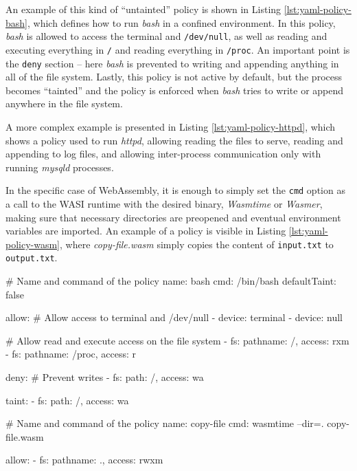 An example of this kind of ``untainted'' policy is shown in Listing \ref{lst:yaml-policy-bash}, which defines how to
run \textit{bash} in a confined environment.
In this policy, \textit{bash} is allowed to access the terminal and \texttt{/dev/null}, as well
as reading and executing everything in \texttt{/} and reading everything in \texttt{/proc}.
An important point is the \texttt{deny} section -- here \textit{bash} is prevented to writing and
appending anything in all of the file system.
Lastly, this policy is not active by default, but the process becomes ``tainted'' and the policy is enforced
when \textit{bash} tries to write or append anywhere in the file system.

A more complex example is presented in Listing \ref{lst:yaml-policy-httpd}, which shows a policy
used to run \textit{httpd}, allowing reading the files to serve, reading and appending to log files,
and allowing inter-process communication only with running \textit{mysqld} processes.

In the specific case of WebAssembly, it is enough to simply set the \texttt{cmd} option as
a call to the WASI runtime with the desired binary, \textit{Wasmtime} or \textit{Wasmer}, making sure that
necessary directories are preopened and eventual environment variables are imported.
An example of a policy is visible in Listing \ref{lst:yaml-policy-wasm}, where \textit{copy-file.wasm} simply copies
the content of \texttt{input.txt} to \texttt{output.txt}.

\vspace*{0.5cm}
\begin{code}[language=yaml, caption=A policy for running bash., label=lst:yaml-policy-bash]
# Name and command of the policy
name: bash
cmd: /bin/bash
defaultTaint: false

allow:
  # Allow access to terminal and /dev/null
  - device: terminal
  - device: null

  # Allow read and execute access on the file system
  - fs: {pathname: /, access: rxm}
  - fs: {pathname: /proc, access: r}

deny:
  # Prevent writes
  - fs: {path: /, access: wa}

taint:
  - fs: {path: /, access: wa}
\end{code}

\begin{code}[language=yaml, caption=Running WASM with BPFContain., label=lst:yaml-policy-wasm]
# Name and command of the policy
name: copy-file
cmd: wasmtime --dir=. copy-file.wasm

allow:
  - fs: {pathname: ., access: rwxm}
\end{code}

